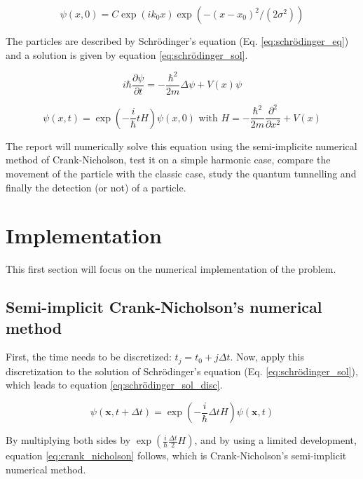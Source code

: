 \documentclass[a4paper,12pt,twoside]{article}
\newcommand{\mbf}[1]{\mathbf{#1}} %
\newcommand{\bracket}[1]{\left(#1\right)}
\newcommand{\lapl}[1]{\Delta#1}
\begin{document}
  \begin{equation}
    \psi(x,0) = C\exp(ik_0x)\exp(-(x-x_0)^2/(2\sigma^2))
    \label{eq:wave_packet}
  \end{equation}

  The particles are described by Schrödinger's equation (Eq. \eqref{eq:schrödinger_eq}) and a solution is given by equation \eqref{eq:schrödinger_sol}.

  \begin{equation}
    i\hbar\frac{\partial\psi}{\partial t} = -\frac{\hbar^2}{2m}\lapl{\psi} + V(x)\psi
    \label{eq:schrödinger_eq}
  \end{equation}

  \begin{equation}
    \psi(x,t) = \exp\bracket{-\frac{i}{\hbar}tH}\psi(x,0)\text{ with }H=-\frac{\hbar^2}{2m}\frac{\partial^2}{\partial x^2} + V(x)
    \label{eq:schrödinger_sol}
  \end{equation}

  The report will numerically solve this equation using the semi-implicite numerical method of Crank-Nicholson, test it on a simple harmonic case, compare the movement of the particle with the classic case, study the quantum tunnelling and finally the detection (or not) of a particle.

\newpage
\section{Implementation}\label{sec:impl}
  This first section will focus on the numerical implementation of the problem.

  \subsection{Semi-implicit Crank-Nicholson's numerical method}
    First, the time needs to be discretized: $t_j = t_0 + j\Delta t$.
    Now, apply this discretization to the solution of Schrödinger's equation (Eq. \eqref{eq:schrödinger_sol}), which leads to equation \eqref{eq:schrödinger_sol_disc}.

    \begin{equation}
      \psi(\mbf{x}, t + \Delta t) = \exp\bracket{-\frac{i}{\hbar}\Delta t H}\psi(\mbf{x}, t)
      \label{eq:schrödinger_sol_disc}
    \end{equation}

    By multiplying both sides by $\exp\bracket{\frac{i}{\hbar}\frac{\Delta t}{2}H}$, and by using a limited development, equation \eqref{eq:crank_nicholson} follows, which is Crank-Nicholson's semi-implicit numerical method.
\end{document}
